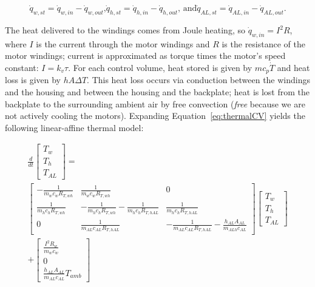 \documentclass{report}
\begin{document}
\begin{subequations}\label{eq:thermalCV}
\begin{equation}
\dot{q}_{w,st} = \dot{q}_{w,in} - \dot{q}_{w,out}\text{,}
\end{equation}
\begin{equation}
\dot{q}_{h,st} = \dot{q}_{h,in} - \dot{q}_{h,out}\text{, and}
\end{equation}
\begin{equation}
\dot{q}_{AL,st} = \dot{q}_{AL,in} - \dot{q}_{AL,out}\text{.}
\end{equation}
\end{subequations}

The heat delivered to the windings comes from Joule heating, so $\dot{q}_{w,in} = I^{2}R$, where $I$ is the current through the motor windings and $R$ is the resistance of the motor windings; current is approximated as torque times the motor's speed constant: $I = k_{v}\tau$. For each control volume, heat stored is given by $m c_{p}\dot{T}$ and heat loss is given by $h A \Delta T$. This heat loss occurs via conduction between the windings and the housing and between the housing and the backplate; heat is lost from the backplate to the surrounding ambient air by free convection (\textit{free} because we are not actively cooling the motors). Expanding Equation~\ref{eq:thermalCV} yields the following linear-affine thermal model:

\begin{multline}\label{eq:thermalSSmodel}
\frac{d}{dt}\begin{bmatrix}
T_{w}\\
T_{h}\\
T_{AL}
\end{bmatrix}
= \\
\begin{bmatrix}
-\frac{1}{m_{w}c_{w}R_{T,wh}} & \frac{1}{m_{w}c_{w}R_{T,wh}} & 0 \\
\frac{1}{m_{h}c_{h}R_{T,wh}} & -\frac{1}{m_{h}c_{h}R_{T,wh}} - \frac{1}{m_{h}c_{h}R_{T,hAL}} & \frac{1}{m_{h}c_{h}R_{T,hAL}} \\
0 & \frac{1}{m_{AL}c_{AL}R_{T,hAL}} & -\frac{1}{m_{AL}c_{AL}R_{T,hAL}} - \frac{h_{AL}A_{AL}}{m_{ALh}c_{AL}}
\end{bmatrix}
\begin{bmatrix}
T_{w}\\
T_{h}\\
T_{AL}
\end{bmatrix} \\
+
\begin{bmatrix}
\frac{I^{2}R_{w}}{m_{w}c_{w}}\\
0\\
\frac{h_{AL}A_{AL}}{m_{AL}c_{AL}}T_{amb}
\end{bmatrix}
\end{multline}
\end{document}
